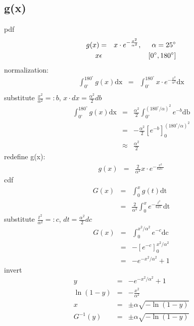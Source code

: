 \documentclass{article}
\begin{document}
	\subsection{g(x)}
		pdf
		\begin{eqnarray*}
			g(x)&=&x\cdot e^{-\frac{x^2}{\alpha^2}}, \hspace{0.5cm}\alpha=25^\circ\\
			x&\epsilon&[0^\circ,180^\circ]
		\end{eqnarray*}
		normalization:
		\begin{eqnarray*}
			\int_{0^\circ}^{180^\circ}g(x)\mathrm{dx}&=&\int_{0^\circ}^{180^\circ}x\cdot e^{-\frac{x^2}{\alpha^2}}\mathrm{dx}\\
		\end{eqnarray*}
		substitute $\frac{x^2}{\alpha^2}=:b$, $x\cdot dx=\frac{\alpha^2}{2} db$
		\begin{eqnarray*}
			\int_{0^\circ}^{180^\circ}g(x)\mathrm{dx}&=&\frac{\alpha^2}{2}\int_{0^\circ}^{(180^\circ/\alpha)^2}e^{-b}\mathrm{db}\\
			&=&-\frac{\alpha^2}{2}\left[e^{-b}\right]_0^{(180^\circ/\alpha)^2}\\
			&\approx&\frac{\alpha^2}{2}
		\end{eqnarray*}
		redefine g(x):
		\begin{eqnarray*}
			g(x)&=&\frac{2}{\alpha^2}x\cdot e^{-\frac{x^2}{625^\circ}}
		\end{eqnarray*}
		cdf
		\begin{eqnarray*}
			G(x)&=&\int_0^x g(t)\mathrm{dt}\\
			&=&\frac{2}{\alpha^2}\int_0^x e^{-\frac{				t^2}{625^\circ}}\mathrm{dt}
		\end{eqnarray*}
		substitute $\frac{t^2}{\alpha^2}=:c$, $dt=\frac{\alpha^2}{2} dc$
		\begin{eqnarray*}
			G(x)&=&\int_0^{x^2/\alpha^2} e^{-c}\mathrm{dc}\\
			&=&-\left[e^{-c}\right]_0^{x^2/\alpha^2}\\
			&=&-e^{-x^2/\alpha^2}+1
		\end{eqnarray*}
		invert
		\begin{eqnarray*}
			y&=&-e^{-x^2/\alpha^2}+1\\
			\ln(1-y)&=&-\frac{x^2}{\alpha^2}\\
			x&=&\pm\alpha\sqrt{-\ln(1-y)}\\
			G^{-1}(y)&=&\pm\alpha\sqrt{-\ln(1-y)}
		\end{eqnarray*}
\end{document}

